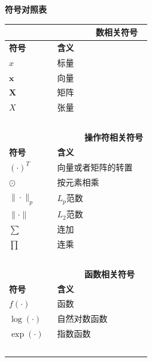 \documentclass[UTF-8]{progbookcn}
\begin{document}
\centerline{\Large\bf{符\hspace{0.5em}号\hspace{0.5em}对\hspace{0.5em}照\hspace{0.5em}表}\vspace{1em}}
\begin{table}[!ht]
\begin{tabular}{l|l}
\multicolumn{2}{l}{~~~~~~~~~~~~~~~~~~\textbf{数相关符号}}\\ \hline
\textbf{符号}\hspace{12em} & \textbf{含义}          \\  \hline
$x$                                & 标量 \\
$\bm{x}$                         & 向量  \\
$\bm{X}$                         & 矩阵     \\
$X$                         & 张量       \\ \hline
\multicolumn{2}{l}{~~~~~~~~~~~~~~~~~~}\\
\multicolumn{2}{l}{~~~~~~~~~~~~~~~~~~\textbf{操作符相关符号}}\\ \hline
\textbf{符号}\hspace{12em} & \textbf{含义}          \\  \hline
$(\cdot)^T$                  & 向量或者矩阵的转置 \\
$\odot$                         & 按元素相乘  \\
$\|\cdot\|_p$                         & $L_p$范数     \\
$\|\cdot\|$                         & $L_2$范数     \\
$\sum$                         & 连加     \\
$\prod$                         & 连乘     \\
\hline\multicolumn{2}{l}{~~~~~~~~~~~~~~~~~~}\\
\multicolumn{2}{l}{~~~~~~~~~~~~~~~~~~\textbf{函数相关符号}}\\ \hline
\textbf{符号}\hspace{12em} & \textbf{含义}          \\  \hline
$f(\cdot)$                                & 函数 \\
$\log(\cdot)$                         & 自然对数函数  \\
$\exp(\cdot)$                         & 指数函数     \\
\hline \multicolumn{2}{l}{~~~~~~~~~~~~~~~~~~}\\

\end{tabular}
\end{table}
\end{document}

